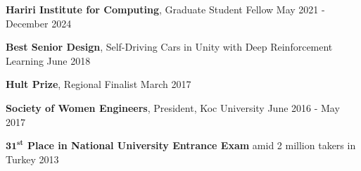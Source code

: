 

\textbf{Hariri Institute for Computing}, Graduate Student Fellow \hfill May 2021 - December 2024

\textbf{Best Senior Design}, Self-Driving Cars in Unity with Deep Reinforcement Learning \hfill June 2018

\textbf{Hult Prize}, Regional Finalist \hfill March 2017

\textbf{Society of Women Engineers}, President, Koc University \hfill June 2016 - May 2017

\textbf{$\mathbf{31^{st}}$ Place in National University Entrance Exam} amid 2 million takers in Turkey \hfill 2013